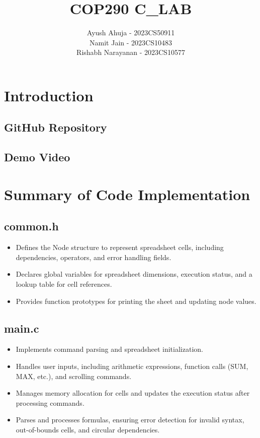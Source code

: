 \documentclass{article}
\title{\LARGE COP290 C\_LAB}
\author{
    Ayush Ahuja - 2023CS50911\\
    Namit Jain - 2023CS10483\\
    Rishabh Narayanan - 2023CS10577
}
\date{}
\begin{document}
\maketitle

\section{Introduction}

\subsection{GitHub Repository}

\subsection{Demo Video}


\section{Summary of Code Implementation}

\singlespacing %

\subsection{common.h}
\begin{itemize}
    \item Defines the Node structure to represent spreadsheet cells, including dependencies, operators, and error handling fields.
    \item Declares global variables for spreadsheet dimensions, execution status, and a lookup table for cell references.
    \item Provides function prototypes for printing the sheet and updating node values.
\end{itemize}

\subsection{main.c}
\begin{itemize}
    \item Implements command parsing and spreadsheet initialization.
    \item Handles user inputs, including arithmetic expressions, function calls (SUM, MAX, etc.), and scrolling commands.
    \item Manages memory allocation for cells and updates the execution status after processing commands.
    \item Parses and processes formulas, ensuring error detection for invalid syntax, out-of-bounds cells, and circular dependencies.
\end{itemize}
\end{document}
